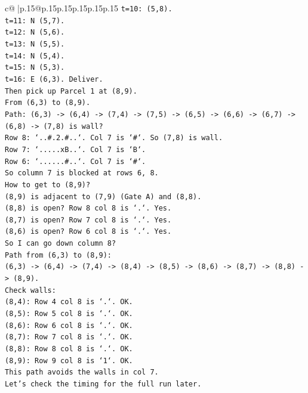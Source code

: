 \documentclass{article}
\begin{document}
{\begin{supertabular}{c@{$\;$}|p{.15\linewidth}@{}p{.15\linewidth}p{.15\linewidth}p{.15\linewidth}p{.15\linewidth}p{.15\linewidth}}
{{{\texttt{t=10: (5,8).} \\
\texttt{t=11: N (5,7).} \\
\texttt{t=12: N (5,6).} \\
\texttt{t=13: N (5,5).} \\
\texttt{t=14: N (5,4).} \\
\texttt{t=15: N (5,3).} \\
\texttt{t=16: E (6,3). Deliver.} \\
\texttt{Then pick up Parcel 1 at (8,9).} \\
\texttt{From (6,3) to (8,9).} \\
\texttt{Path: (6,3) {-}> (6,4) {-}> (7,4) {-}> (7,5) {-}> (6,5) {-}> (6,6) {-}> (6,7) {-}> (6,8) {-}> (7,8) is wall?} \\
\texttt{Row 8: `..\#.2.\#..`. Col 7 is `\#`. So (7,8) is wall.} \\
\texttt{Row 7: `.....xB..`. Col 7 is `B`.} \\
\texttt{Row 6: `......\#..`. Col 7 is `\#`.} \\
\texttt{So column 7 is blocked at rows 6, 8.} \\
\texttt{How to get to (8,9)?} \\
\texttt{(8,9) is adjacent to (7,9) (Gate A) and (8,8).} \\
\texttt{(8,8) is open? Row 8 col 8 is `.`. Yes.} \\
\texttt{(8,7) is open? Row 7 col 8 is `.`. Yes.} \\
\texttt{(8,6) is open? Row 6 col 8 is `.`. Yes.} \\
\texttt{So I can go down column 8?} \\
\texttt{Path from (6,3) to (8,9):} \\
\texttt{(6,3) {-}> (6,4) {-}> (7,4) {-}> (8,4) {-}> (8,5) {-}> (8,6) {-}> (8,7) {-}> (8,8) {-}> (8,9).} \\
\texttt{Check walls:} \\
\texttt{(8,4): Row 4 col 8 is `.`. OK.} \\
\texttt{(8,5): Row 5 col 8 is `.`. OK.} \\
\texttt{(8,6): Row 6 col 8 is `.`. OK.} \\
\texttt{(8,7): Row 7 col 8 is `.`. OK.} \\
\texttt{(8,8): Row 8 col 8 is `.`. OK.} \\
\texttt{(8,9): Row 9 col 8 is `1`. OK.} \\
\texttt{This path avoids the walls in col 7.} \\
\texttt{Let's check the timing for the full run later.} \\
}}}
\end{supertabular}}
\end{document}
